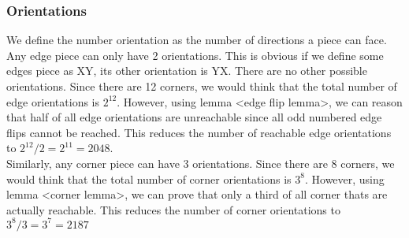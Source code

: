 \documentclass[titlepage]{report}[12pt]
\begin{document}
\subsubsection{Orientations}
We define the number orientation as the number of directions a piece can face.
\\
\indent
Any edge piece can only have 2 orientations. This is obvious if we define some edges piece as XY, its other orientation is YX. There are no other possible orientations. Since there are 12 corners, we would think that the total number of edge orientations is \begin{math} 2^{12} \end{math}. However, using lemma <edge flip lemma>, we can reason that half of all edge orientations are unreachable since all odd numbered edge flips cannot be reached. This reduces the number of reachable edge orientations to  \begin{math} 2^{12} / 2 =  2^{11} = 2048\end{math}.
\\
\indent
Similarly, any corner piece can have 3 orientations. Since there are 8 corners, we would think that the total number of corner orientations is \begin{math} 3^{8} \end{math}. However, using lemma <corner lemma>, we can prove that only a third of all corner thats are actually reachable. This reduces the number of corner orientations to  \begin{math} 3^{8} / 3 =  3^{7} = 2187 \end{math}
\end{document}
